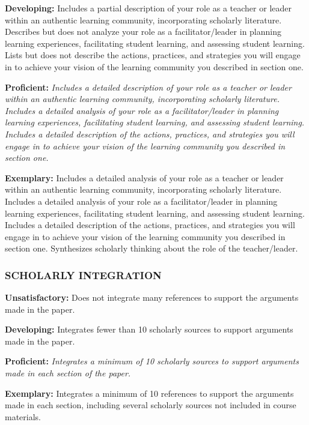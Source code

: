 \documentclass[
]{book}
\begin{document}
\textbf{Developing:} Includes a partial description of your role as a teacher or leader within an authentic learning community, incorporating scholarly literature. Describes but does not analyze your role as a facilitator/leader in planning learning experiences, facilitating student learning, and assessing student learning. Lists but does not describe the actions, practices, and strategies you will engage in to achieve your vision of the learning community you described in section one.

\textbf{Proficient:} \emph{Includes a detailed description of your role as a teacher or leader within an authentic learning community, incorporating scholarly literature. Includes a detailed analysis of your role as a facilitator/leader in planning learning experiences, facilitating student learning, and assessing student learning. Includes a detailed description of the actions, practices, and strategies you will engage in to achieve your vision of the learning community you described in section one.}

\textbf{Exemplary:} Includes a detailed analysis of your role as a teacher or leader within an authentic learning community, incorporating scholarly literature. Includes a detailed analysis of your role as a facilitator/leader in planning learning experiences, facilitating student learning, and assessing student learning. Includes a detailed description of the actions, practices, and strategies you will engage in to achieve your vision of the learning community you described in section one. Synthesizes scholarly thinking about the role of the teacher/leader.

\hypertarget{scholarly-integration-2}{%
\subsubsection*{SCHOLARLY INTEGRATION}\label{scholarly-integration-2}}

\textbf{Unsatisfactory:} Does not integrate many references to support the arguments made in the paper.

\textbf{Developing:} Integrates fewer than 10 scholarly sources to support arguments made in the paper.

\textbf{Proficient:} \emph{Integrates a minimum of 10 scholarly sources to support arguments made in each section of the paper.}

\textbf{Exemplary:} Integrates a minimum of 10 references to support the arguments made in each section, including several scholarly sources not included in course materials.
\end{document}
